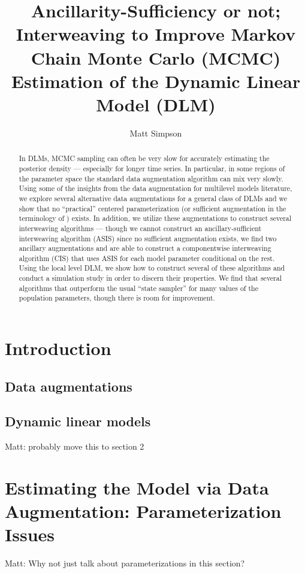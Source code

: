 \documentclass{article}
\newcommand{\matt}[1]{{\color{red} Matt: #1}}
\begin{document}
\title{Ancillarity-Sufficiency or not; Interweaving to Improve Markov Chain Monte Carlo (MCMC) Estimation of the Dynamic Linear Model (DLM)}
\author{Matt Simpson}
\maketitle

\begin{abstract}
In DLMs, MCMC sampling can often be very slow for accurately estimating the posterior density --- especially for longer time series. In particular, in some regions of the parameter space the standard data augmentation algorithm can mix very slowly. Using some of the insights from the data augmentation for multilevel models literature, we explore several alternative data augmentations for a general class of DLMs and we show that no ``practical'' centered parameterization (or sufficient augmentation in the terminology of \citet{yu2011center}) exists. In addition, we utilize these augmentations to construct several interweaving algorithms --- though we cannot construct an ancillary-sufficient interweaving algorithm (ASIS) since no sufficient augmentation exists, we find two ancillary augmentations and are able to construct a componentwise interweaving algorithm (CIS) that uses ASIS for each model parameter conditional on the rest. Using the local level DLM, we show how to construct several of these algorithms and conduct a simulation study in order to discern their properties. We find that several algorithms that outperform the usual ``state sampler'' for many values of the population parameters, though there is room for improvement.
\end{abstract}


\section{Introduction}\label{sec:Intro}

\subsection{Data augmentations}

\subsection{Dynamic linear models} \matt{probably move this to section 2} 

\section{Estimating the Model via Data Augmentation: Parameterization Issues}\label{sec:DLMest}
\matt{Why not just talk about parameterizations in this section?}
\end{document}
